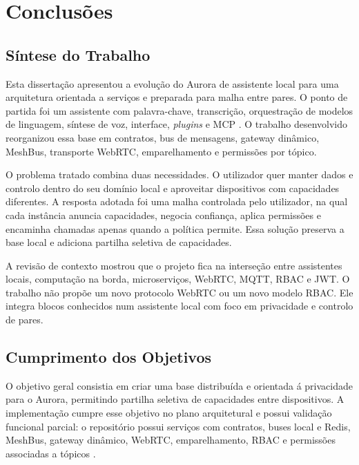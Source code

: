 \chapter{Conclus\~{o}es}
\label{chap:conclusoes}

\section{S\'{i}ntese do Trabalho}
\label{sec:sintese-trabalho}

Esta disserta\c{c}\~{a}o apresentou a evolu\c{c}\~{a}o do Aurora de assistente local para uma arquitetura orientada a servi\c{c}os e preparada para malha entre pares. O ponto de partida foi um assistente com palavra-chave, transcri\c{c}\~{a}o, orquestra\c{c}\~{a}o de modelos de linguagem, s\'{i}ntese de voz, interface, \textit{plugins} e \gls{MCP} \cite{aurora_repo}. O trabalho desenvolvido reorganizou essa base em contratos, bus de mensagens, gateway din\^{a}mico, MeshBus, transporte WebRTC, emparelhamento e permiss\~{o}es por t\'{o}pico.

O problema tratado combina duas necessidades. O utilizador quer manter dados e controlo dentro do seu dom\'{i}nio local e aproveitar dispositivos com capacidades diferentes. A resposta adotada foi uma malha controlada pelo utilizador, na qual cada inst\^{a}ncia anuncia capacidades, negocia confian\c{c}a, aplica permiss\~{o}es e encaminha chamadas apenas quando a pol\'{i}tica permite. Essa solu\c{c}\~{a}o preserva a base local e adiciona partilha seletiva de capacidades.

A revis\~{a}o de contexto mostrou que o projeto fica na interse\c{c}\~{a}o entre assistentes locais, computa\c{c}\~{a}o na borda, microservi\c{c}os, WebRTC, MQTT, RBAC e JWT. O trabalho n\~{a}o prop\~{o}e um novo protocolo WebRTC ou um novo modelo RBAC. Ele integra blocos conhecidos num assistente local com foco em privacidade e controlo de pares.

\section{Cumprimento dos Objetivos}
\label{sec:cumprimento-objetivos}

O objetivo geral consistia em criar uma base distribu\'{i}da e orientada \'{a} privacidade para o Aurora, permitindo partilha seletiva de capacidades entre dispositivos. A implementa\c{c}\~{a}o cumpre esse objetivo no plano arquitetural e possui valida\c{c}\~{a}o funcional parcial: o reposit\'{o}rio possui servi\c{c}os com contratos, buses local e Redis, MeshBus, gateway din\^{a}mico, WebRTC, emparelhamento, RBAC e permiss\~{o}es associadas a t\'{o}picos \cite{aurora_architecture_doc,aurora_gateway_doc,aurora_handoff_doc}.

